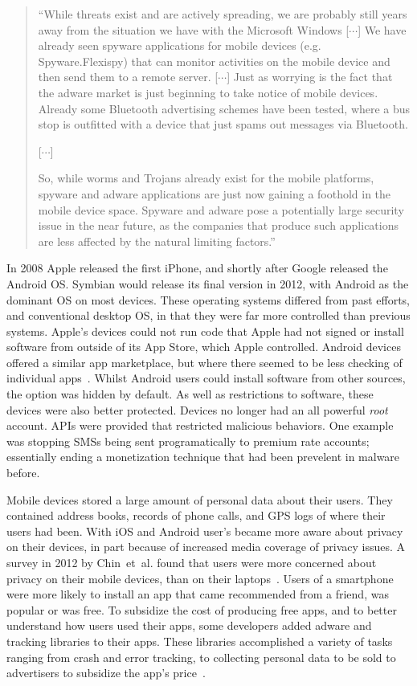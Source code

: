 \documentclass[thesis.tex]{subfiles}
\begin{document}
\begin{quote}
  ``While threats exist and are actively spreading, we are probably
  still years away from the situation we have with the Microsoft Windows
  [$\cdots$] We have already seen spyware applications for mobile devices
  (e.g. Spyware.Flexispy) that can monitor activities on the mobile
  device and then send them to a remote server. [$\cdots$] Just as
  worrying is the fact that the adware market is just beginning to take
  notice of mobile devices. Already some Bluetooth advertising schemes
  have been tested, where a bus stop is outfitted with a device that
  just spams out messages via Bluetooth.

  [$\cdots$]
  
  So, while worms and Trojans already exist for the mobile
  platforms, spyware and adware applications are just now gaining a
  foothold in the mobile device space. Spyware and adware pose a
  potentially large security issue in the near future, as the companies
  that produce such applications are less affected by the natural
  limiting factors.''
\end{quote}

In 2008 Apple released the first iPhone, and shortly after Google
released the Android OS.  Symbian would release its final version in
2012, with Android as the dominant OS on most devices.  These
operating systems differed from past efforts, and conventional desktop
OS, in that they were far more controlled than previous systems.
Apple's devices could not run code that Apple had not signed or
install software from outside of its App Store, which Apple
controlled.  Android devices offered a similar app marketplace, but
where there seemed to be less checking of individual
apps~\cite{oberheide_dissecting_2012}. Whilst Android users could
install software from other sources, the option was hidden by default.
As well as restrictions to software, these devices were also better
protected.  Devices no longer had an all powerful \emph{root} account.
APIs were provided that restricted malicious behaviors.  One example
was stopping SMSs being sent programatically to premium rate accounts;
essentially ending a monetization technique that had been prevelent in
malware before. 

Mobile devices stored a large amount of personal data about their
users.  They contained address books, records of phone calls, and GPS
logs of where their users had been.  With iOS and Android user's
became more aware about privacy on their devices, in part because of
increased media coverage of privacy issues.  A survey in 2012 by
Chin~et~al{.} found that users were more concerned about privacy on
their mobile devices, than on their
laptops~\cite{chin_measuring_2012}. Users of a smartphone were more
likely to install an app that came recommended from a friend, was
popular or was free.  To subsidize the cost of producing free apps,
and to better understand how users used their apps, some developers
added adware and tracking libraries to their apps.  These libraries
accomplished a variety of tasks ranging from crash and error tracking,
to collecting personal data to be sold to advertisers to subsidize the
app's price~\cite{seungyeop_han_study_2012}.
\end{document}
